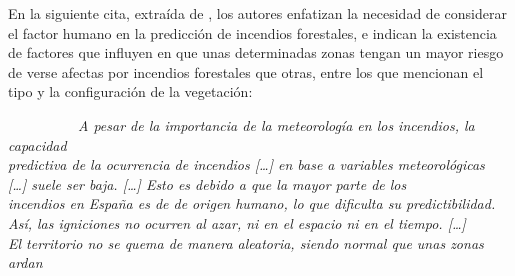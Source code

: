 \documentclass[12pt,a4paper,]{book}
\numberwithin{dummy}{section}
\theoremstyle{ocrenumbox}
\theoremstyle{blacknumex}
\theoremstyle{blacknumbox}
\theoremstyle{ocrenum}
\theoremstyle{ocrenum}
\begin{document}
En la siguiente cita, extraída de \citet{incendioCamCLim}, los autores
enfatizan la necesidad de considerar el factor humano en la predicción
de incendios forestales, e indican la existencia de factores que
influyen en que unas determinadas zonas tengan un mayor riesgo de verse
afectas por incendios forestales que otras, entre los que mencionan el
tipo y la configuración de la vegetación:

~~~~~~~~~~\emph{A pesar de la importancia de la meteorología en los
incendios, la capacidad }\\
\hspace*{0.333em}\hspace*{0.333em}\hspace*{0.333em}\hspace*{0.333em}\hspace*{0.333em}\hspace*{0.333em}\emph{predictiva
de la ocurrencia de incendios {[}\ldots{]} en base a variables
meteorológicas}\\
\hspace*{0.333em}\hspace*{0.333em}\hspace*{0.333em}\hspace*{0.333em}\hspace*{0.333em}\hspace*{0.333em}\emph{{[}\ldots{]}
suele ser baja. {[}\ldots{]} Esto es debido a que la mayor parte de los
}\\
\hspace*{0.333em}\hspace*{0.333em}\hspace*{0.333em}\hspace*{0.333em}\hspace*{0.333em}\hspace*{0.333em}\emph{incendios
en España es de de origen humano, lo que dificulta su
predictibilidad.}\\
\hspace*{0.333em}\hspace*{0.333em}\hspace*{0.333em}\hspace*{0.333em}\hspace*{0.333em}\hspace*{0.333em}\emph{Así,
las igniciones no ocurren al azar, ni en el espacio ni en el tiempo.
{[}\ldots{]} }\\
\hspace*{0.333em}\hspace*{0.333em}\hspace*{0.333em}\hspace*{0.333em}\hspace*{0.333em}\hspace*{0.333em}\emph{El
territorio no se quema de manera aleatoria, siendo normal que unas zonas
ardan}\\
\end{document}
